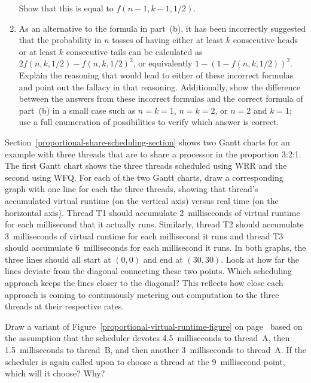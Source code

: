 \begin{chapterEnumerate}
\begin{enumerate}
Show that this is equal to $f(n-1,k-1,1/2)$.
\item
As an alternative to the formula in part~(b), it has been incorrectly suggested that the probability in $n$ tosses of having either at least $k$ consecutive heads or at least $k$ consecutive tails can be calculated as $2 f(n, k, 1/2) - f(n, k, 1/2)^2$, or equivalently $1 - (1 - f(n, k, 1/2))^2$. Explain the reasoning that would lead to either of these incorrect formulas and point out the fallacy in that reasoning. Additionally, show the difference between the answers from these incorrect formulas and the correct formula of part~(b) in a small case such as $n = k = 1$, $n = k = 2$, or $n = 2$ and $k = 1$; use a full enumeration of possibilities to verify which answer is correct.
\end{enumerate}
\item\label{WRR-WFQ-comparison-exercise}
Section~\ref{proportional-share-scheduling-section} shows two Gantt charts for an example
with three threads that are to share a processor in the proportion 3:2:1.  The first Gantt chart shows the three threads scheduled using WRR and the second using WFQ.  For each of the two Gantt charts, draw a corresponding graph with one line for each the three threads, showing that thread's accumulated virtual runtime (on the vertical axis) versus real time (on the horizontal axis).  Thread T1 should accumulate 2~milliseconds of virtual runtime for each millisecond that it actually runs.  Similarly, thread T2 should accumulate 3~milliseconds of virtual runtime for each millisecond it runs and thread T3 should accumulate 6~milliseconds for each millisecond it runs.  In both graphs, the three lines should all start at $(0,0)$ and end at $(30,30)$.  Look at how far the lines deviate from the diagonal connecting these two points.  Which scheduling approach keeps the lines closer to the diagonal?  This reflects how close each approach is coming to continuously metering out computation to the three threads at their respective rates.
\item
Draw a variant of Figure~\ref{proportional-virtual-runtime-figure} on page~\pageref{proportional-virtual-runtime-figure}
based on the assumption that the scheduler devotes 4.5~milliseconds to thread~A, then 1.5~milliseconds to thread~B, and then
another 3~milliseconds to thread~A.  If the scheduler is again called upon to choose a thread at the 9~millisecond point,
which will it choose?  Why?
\end{chapterEnumerate}

